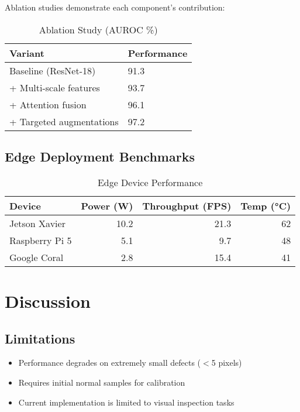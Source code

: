\documentclass[conference]{IEEEtran}
\begin{document}
Ablation studies demonstrate each component's contribution:

\begin{table}[htbp]
\caption{Ablation Study (AUROC \%)}
\label{tab:ablation}
\centering
\begin{tabularx}{\columnwidth}{lX}
\toprule
Variant & Performance \\
\midrule
Baseline (ResNet-18) & 91.3 \\
+ Multi-scale features & 93.7 \\
+ Attention fusion & 96.1 \\
+ Targeted augmentations & 97.2 \\
\bottomrule
\end{tabularx}
\end{table}

\subsection{Edge Deployment Benchmarks}
\begin{table}[htbp]
\caption{Edge Device Performance}
\label{tab:edge}
\centering
\begin{tabularx}{0.9\columnwidth}{lrrr}
\toprule
Device & Power (W) & Throughput (FPS) & Temp (°C) \\
\midrule
Jetson Xavier & 10.2 & 21.3 & 62 \\
Raspberry Pi 5 & 5.1 & 9.7 & 48 \\
Google Coral & 2.8 & 15.4 & 41 \\
\bottomrule
\end{tabularx}
\end{table}

\section{Discussion}
\subsection{Limitations}
\begin{itemize}
\item Performance degrades on extremely small defects ($<$5 pixels)
\item Requires initial normal samples for calibration
\item Current implementation is limited to visual inspection tasks
\end{itemize}
\end{document}
